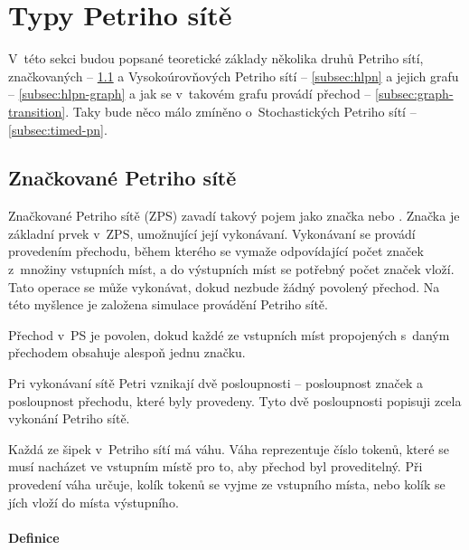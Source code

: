 \section{Typy Petriho sítě}

V~této sekci budou popsané teoretické základy několika druhů Petriho sítí, značkovaných -- \ref{subsec:marked-pn} a Vysokoúrovňových Petriho sítí -- \ref{subsec:hlpn} a jejich grafu -- \ref{subsec:hlpn-graph} a jak se v~takovém grafu provádí přechod -- \ref{subsec:graph-transition}. Taky bude něco málo zmíněno o~Stochastických Petriho sítí -- \ref{subsec:timed-pn}.

\subsection{Značkované Petriho sítě}
\label{subsec:marked-pn}
Značkované Petriho sítě (ZPS) zavadí takový pojem jako značka nebo . Značka je základní prvek v~ZPS, umožnující její vykonávaní. Vykonávaní se provádí provedením přechodu, během kterého se vymaže odpovídající počet značek z~množiny vstupních míst, a do výstupních míst se potřebný počet značek vloží. Tato operace se může vykonávat, dokud nezbude žádný povolený přechod. Na této myšlence je založena simulace provádění Petriho sítě.

Přechod v~PS je povolen, dokud každé ze vstupních míst propojených s~daným přechodem obsahuje alespoň jednu značku.

Pri vykonávaní sítě Petri vznikají dvě posloupnosti -- posloupnost značek a posloupnost přechodu, které byly provedeny. Tyto dvě posloupnosti popisuji zcela vykonání Petriho sítě. \cite[p.18--19]{PNandMoS}

Každá ze šipek v~Petriho sítí má váhu. Váha reprezentuje číslo tokenů, které se musí nacházet ve vstupním místě pro to, aby přechod byl proveditelný. Při provedení váha určuje, kolík tokenů se vyjme ze vstupního místa, nebo kolík se jích vloží do místa výstupního.

\paragraph{Definice}

